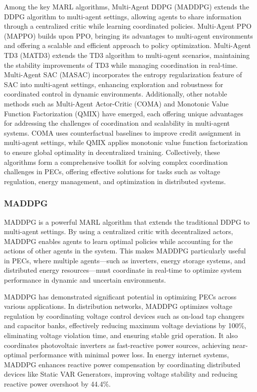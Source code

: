 Among the key MARL algorithms, Multi-Agent DDPG (MADDPG) \cite{lowe2017multi} extends the DDPG algorithm to multi-agent settings, allowing agents to share information through a centralized critic while learning coordinated policies. Multi-Agent PPO (MAPPO) \cite{yu2022surprising} builds upon PPO, bringing its advantages to multi-agent environments and offering a scalable and efficient approach to policy optimization. Multi-Agent TD3 (MATD3) \cite{ackermann2019reducing} extends the TD3 algorithm to multi-agent scenarios, maintaining the stability improvements of TD3 while managing coordination in real-time. Multi-Agent SAC (MASAC) \cite {kuba2021trust} incorporates the entropy regularization feature of SAC into multi-agent settings, enhancing exploration and robustness for coordinated control in dynamic environments. Additionally, other notable methods such as Multi-Agent Actor-Critic (COMA) \cite{foerster2018counterfactual} and Monotonic Value Function Factorization (QMIX) \cite{rashid2020monotonic} have emerged, each offering unique advantages for addressing the challenges of coordination and scalability in multi-agent systems. COMA uses counterfactual baselines to improve credit assignment in multi-agent settings, while QMIX applies monotonic value function factorization to ensure global optimality in decentralized training. Collectively, these algorithms form a comprehensive toolkit for solving complex coordination challenges in PECs, offering effective solutions for tasks such as voltage regulation, energy management, and optimization in distributed systems.

\subsubsection{MADDPG}

MADDPG is a powerful MARL algorithm that extends the traditional DDPG to multi-agent settings. By using a centralized critic with decentralized actors, MADDPG enables agents to learn optimal policies while accounting for the actions of other agents in the system. This makes MADDPG particularly useful in PECs, where multiple agents—such as inverters, energy storage systems, and distributed energy resources—must coordinate in real-time to optimize system performance in dynamic and uncertain environments.

MADDPG has demonstrated significant potential in optimizing PECs across various applications. In distribution networks, MADDPG optimizes voltage regulation by coordinating voltage control devices such as on-load tap changers and capacitor banks, effectively reducing maximum voltage deviations by 100\%, eliminating voltage violation time, and ensuring stable grid operation. It also coordinates photovoltaic inverters as fast-reactive power sources, achieving near-optimal performance with minimal power loss. In energy internet systems, MADDPG enhances reactive power compensation by coordinating distributed devices like Static VAR Generators, improving voltage stability and reducing reactive power overshoot by 44.4\%.

